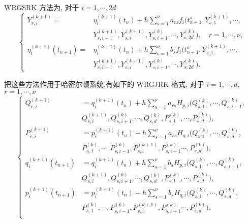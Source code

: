 WRGSRK 方法为, 对于 $i=1,\cdots,2d$
\begin{equation*}
  \left\lbrace
    \begin{aligned}
      Y_{r,i}^{(k+1)}=&\eta_{i}^{(k+1)}(t_{n})+h\sum_{s=1}^{\nu}a_{rs}f_i(t_{n+1}^{s},Y_{s,1}^{(k+1)},\cdots,\\
      &Y_{s,i-1}^{(k+1)},Y_{s,i}^{(k+1)},Y_{s,i+1}^{(k)},\cdots,Y_{s,2d}^{(k)}),\quad r=1,\cdots, \nu, \\
      \eta_{i}^{(k+1)}(t_{n+1})=&\eta_{i}^{(k+1)}(t_{n})+h\sum_{s=1}^{\nu}b_{s}f_i(t_{n+1}^{s},Y_{s,1}^{(k+1)},\cdots,\\
      &Y_{s,i-1}^{(k+1)},Y_{s,i}^{(k+1)},Y_{s,i+1}^{(k)},\cdots,Y_{s,2d}^{(k)}).
    \end{aligned}
  \right.
\end{equation*}

把这些方法作用于哈密尔顿系统,有如下的 WRGJRK 格式, 对于 $i=1,\cdots,d$, $r=1,\cdots,\nu$
\begin{equation}\label{eq:schemerkjacobi}
  \left\lbrace
    \begin{aligned}
      Q_{r,i}^{(k+1)}&=q_{i}^{(k+1)}(t_{n})+h\sum_{s=1}^{\nu}a_{rs}H_{p,i}(Q_{s,1}^{(k)},\cdots,Q_{s,i-1}^{(k)},\\
                            &Q_{s,i}^{(k+1)},Q_{s,i+1}^{(k)},\cdots,Q_{s,d}^{(k)},P_{s,1}^{(k)},\cdots,P_{s,d}^{(k)}),\\
      P_{r,i}^{(k+1)}&=p_{i}^{(k+1)}(t_{n})-h\sum_{s=1}^{\nu}a_{rs}H_{q,i}(Q_{s,1}^{(k)},\cdots,Q_{s,d}^{(k)},\\
                            &P_{s,1}^{(k)},\cdots,P_{s,i-1}^{(k)},P_{s,i}^{(k+1)},P_{s,i+1}^{(k)}\cdots,P_{s,d}^{(k)}),\\
      q_{i}^{(k+1)}(t_{n+1})&=q_{i}^{(k+1)}(t_{n})+h\sum_{s=1}^{\nu}b_{s}H_{p,i}(Q_{s,1}^{(k)},\cdots,Q_{s,i-1}^{(k)},\\
                            &Q_{s,i}^{(k+1)},Q_{s,i+1}^{(k)},\cdots,Q_{s,d}^{(k)},P_{s,1}^{(k)},\cdots,P_{s,d}^{(k)}),\\
      p_{i}^{(k+1)}(t_{n+1})&=p_{i}^{(k+1)}(t_{n})-h\sum_{s=1}^{\nu}b_{s}H_{q,i}(Q_{s,1}^{(k)},\cdots,Q_{s,d}^{(k)},\\
                            &P_{s,1}^{(k)},\cdots,P_{s,i-1}^{(k)},P_{s,i}^{(k+1)},P_{s,i+1}^{(k)}\cdots,P_{s,d}^{(k)}),\\
    \end{aligned}
  \right.
\end{equation}

